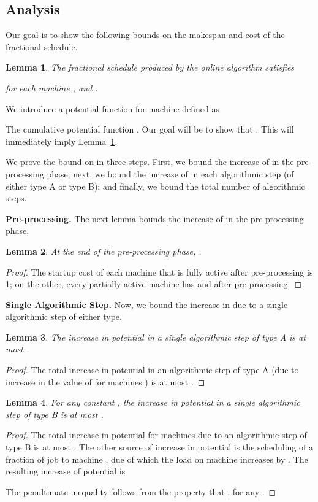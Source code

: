 \documentclass[11pt]{article}
\newtheorem{lemma}{Lemma}
\begin{document}
\subsection{Analysis}
Our goal is to show the following bounds
on the makespan and cost of the fractional schedule.
\begin{lemma}\label{lma:fractional-main}
The fractional schedule produced by the online algorithm satisfies 
 
for each machine , and  
.
\end{lemma}
\noindent
We introduce a potential function  for machine  defined as 

The cumulative potential function .
Our goal will be to show that . 
This will immediately imply Lemma~\ref{lma:fractional-main}.

We prove the bound on  in three steps. First, we bound the increase of 
 in the pre-processing phase; next, we bound the increase of  in
each algorithmic step (of either type A or type B); and finally, we bound the 
total number of algorithmic steps. 

\noindent
{\bf Pre-processing.}
The next lemma bounds the increase of  in the pre-processing phase.
\begin{lemma}
\label{lma:initial}
At the end of the pre-processing phase, .
\end{lemma}
\begin{proof}
The startup cost of each machine that is fully active after pre-processing is 1;
on the other, every partially active machine  has  and 
after pre-processing.
\end{proof}

\noindent
{\bf Single Algorithmic Step.}
Now, we bound the increase in  due to a single algorithmic step of either type.
\begin{lemma}
\label{lma:singleA}
The increase in potential in a single algorithmic step of type A 
is at most .
\end{lemma}
\begin{proof}
The total increase in potential in an algorithmic step of type A (due to increase
in the value of  for machines ) is 
at most 
.
\end{proof}
\noindent
\begin{lemma}
\label{lma:singleB}
For any constant , the increase in potential in a single algorithmic 
step of type B is at most .
\end{lemma}
\begin{proof}
The total increase in potential for machines  due to an 
algorithmic step of type B is at most
.
The other source of increase in potential is the scheduling of 
a fraction of job  to machine , due of which
the load on machine 
 increases by . The resulting
increase of potential  is 

The penultimate inequality follows from the property that
, 
for any .
\end{proof}
\end{document}
